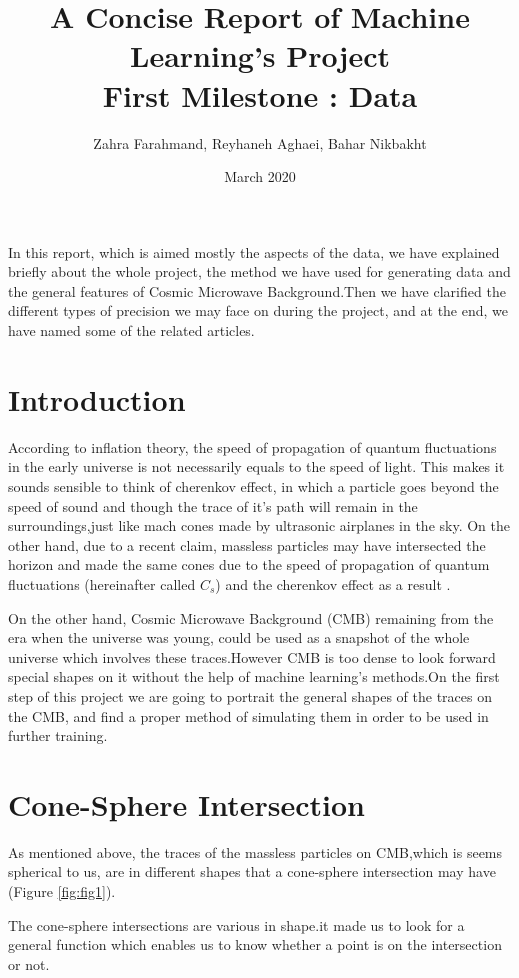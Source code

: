 \documentclass{article}
\title{A Concise Report of Machine Learning's Project\\\large{First Milestone : Data }}
\author{Zahra Farahmand, Reyhaneh Aghaei, Bahar Nikbakht}
\date{March 2020}
\begin{document}
\maketitle

In this report, which is aimed mostly the aspects of the data, we have explained briefly about the whole project, the method we have used for generating data and the general features of Cosmic Microwave Background.Then we have clarified the different types of precision we may face on during the project, and at the end, we have named some of the related articles.

\begin{multicols}{2}

\section{Introduction}
According to inflation theory, the speed of propagation of quantum fluctuations in the early universe is not necessarily equals to the speed of light. This makes it sounds sensible to think of cherenkov effect, in which a particle goes beyond the speed of sound and though the trace of it's path will remain in the surroundings,just like mach cones made by ultrasonic airplanes in the sky. On the other hand, due to a recent claim, massless particles may have intersected the horizon and made the same cones due to the speed of propagation of quantum fluctuations (hereinafter called $C_s$) and the cherenkov effect as a result \cite{claim}.

On the other hand, Cosmic Microwave Background (CMB) remaining from the era when the universe was young, could be used as a snapshot of the whole universe which involves these traces.However CMB is too dense to look forward special shapes on it without the help of machine learning's methods.On the first step of this project we are going to portrait the general shapes of the traces on the CMB, and find a proper method of simulating them in order to be used in further training.

\section{Cone-Sphere Intersection}

As mentioned above, the traces of the massless particles on CMB,which is seems spherical to us, are in different shapes that a cone-sphere intersection may have (Figure \ref{fig:fig1}).

The cone-sphere intersections are various in shape.it made us to look for a general function which enables us to know whether a point is on the intersection or not.

\end{multicols}
\end{document}
